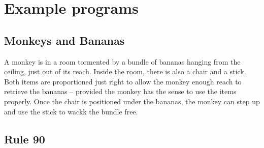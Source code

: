 \documentclass[
a4paper, %
11pt, %
onecolumn, %
openany, %
]{memoir}
\begin{document}
\section{Example programs}
\subsection{Monkeys and Bananas}
A monkey is in a room tormented by a bundle of bananas hanging from the ceiling, just out of its reach. Inside the room, there is also a chair and a stick. Both items are proportioned just right to allow the monkey enough reach to retrieve the bananas -- provided the monkey has the sense to use the items properly. Once the chair is positioned under the bananas, the monkey can step up and use the stick to wackk the bundle free. 
%
\subsection*{Rule 90}

\backmatter





\end{document}
